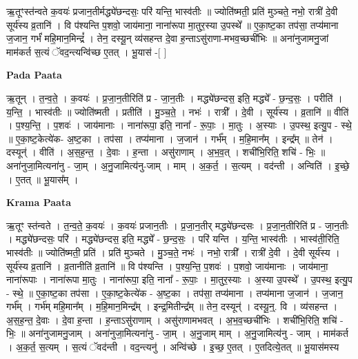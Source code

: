 \documentclass[17pt]{extarticle}
\begin{document}
ऋ॒तूꣳस्त॑न्वते क॒वयः॑ प्रजान॒तीर्मद्ध्ये॑छन्दसः॒ परि॑ यन्ति॒ भास्व॑तीः ॥ ज्योति॑ष्मती॒ प्रति॑ मुञ्चते॒ नभो॒ रात्री॑ दे॒वी सूर्य॑स्य व्र॒तानि॑ । वि प॑श्यन्ति प॒शवो॒ जाय॑माना॒ नाना॑रूपा मा॒तुर॒स्या उ॒पस्थे᳚ ॥ ए॒का॒ष्ट॒का तप॑सा॒ तप्य॑माना ज॒जान॒ गर्भं॑ महि॒मान॒मिन्द्रं᳚ । तेन॒ दस्यू॒न् व्य॑सहन्त दे॒वा ह॒न्ताऽसु॑राणा-मभव॒च्छची॑भिः ॥ अना॑नुजामनु॒जां माम॑कर्त स॒त्यं ॅवद॒न्त्यन्वि॑च्छ ए॒तत् । भू॒यास॑ -[  ] \newline

\textbf{Pada Paata} \newline

ऋ॒तून् । त॒न्व॒ते॒ । क॒वयः॑ । प्र॒जा॒न॒तीरिति॑ प्र - जा॒न॒तीः । मद्ध्ये॑छन्दस॒ इति॒ मद्ध्ये᳚ - छ॒न्द॒सः॒ । परीति॑ । य॒न्ति॒ । भास्व॑तीः ॥ ज्योति॑ष्मती । प्रतीति॑ । मु॒ञ्च॒ते॒ । नभः॑ । रात्री᳚ । दे॒वी । सूर्य॑स्य । व्र॒तानि॑ ॥ वीति॑ । प॒श्य॒न्ति॒ । प॒शवः॑ । जाय॑मानाः । नाना॑रूपा॒ इति॒ नाना᳚ - रू॒पाः॒ । मा॒तुः । अ॒स्याः । उ॒पस्थ॒ इत्यु॒प - स्थे॒ ॥ ए॒का॒ष्ट॒केत्ये॑क- अ॒ष्ट॒का । तप॑सा । तप्य॑माना । ज॒जान॑ । गर्भ᳚म् । म॒हि॒मान᳚म् । इन्द्र᳚म् ॥ तेन॑ । दस्यून्॑ । वीति॑ । अ॒स॒ह॒न्त॒ । दे॒वाः । ह॒न्ता । असु॑राणाम् । अ॒भ॒व॒त् । शची॑भि॒रिति॒ शचि॑ - भिः॒ ॥ अना॑नुजा॒मित्यना॑नु - जा॒म् । अ॒नु॒जामित्य॑नु-जाम् । माम् । अ॒क॒र्त॒ । स॒त्यम् । वद॑न्ती । अन्विति॑ । इ॒च्छे॒ । ए॒तत् ॥ भू॒यास᳚म् ।  \newline


\textbf{Krama Paata} \newline

ऋ॒तूꣳ स्त॑न्वते । त॒न्व॒ते॒ क॒वयः॑ । क॒वयः॑ प्रजान॒तीः । प्र॒जा॒न॒तीर् मद्ध्ये॑छन्दसः । प्र॒जा॒न॒तीरिति॑ प्र - जा॒न॒तीः । मद्ध्ये॑छन्दसः॒ परि॑ । मद्ध्ये॑छन्दस॒ इति॒ मद्ध्ये᳚ - छ॒न्द॒सः॒ । परि॑ यन्ति । य॒न्ति॒ भास्व॑तीः । भास्व॑ती॒रिति॒ भास्व॑तीः ॥ ज्योति॑ष्मती॒ प्रति॑ । प्रति॑ मुञ्चते । मु॒ञ्च॒ते॒ नभः॑ । नभो॒ रात्री᳚ । रात्री॑ दे॒वी । दे॒वी सूर्य॑स्य । सूर्य॑स्य व्र॒तानि॑ । व्र॒तानीति॑ व्र॒तानि॑ ॥ वि प॑श्यन्ति । प॒श्य॒न्ति॒ प॒शवः॑ । प॒शवो॒ जाय॑मानाः । जाय॑माना॒ नाना॑रूपाः । नाना॑रूपा मा॒तुः । नाना॑रूपा॒ इति॒ नाना᳚ - रू॒पाः॒ । मा॒तुर॒स्याः । अ॒स्या उ॒पस्थे᳚ । उ॒पस्थ॒ इत्यु॒प - स्थे॒ ॥ ए॒का॒ष्ट॒का तप॑सा । ए॒का॒ष्ट॒केत्ये॑क - अ॒ष्ट॒का । तप॑सा॒ तप्य॑माना । तप्य॑माना ज॒जान॑ । ज॒जान॒ गर्भ᳚म् । गर्भ॑म् महि॒मान᳚म् । म॒हि॒मान॒मिन्द्र᳚म् । इन्द्र॒मितीन्द्र᳚म् ॥ तेन॒ दस्यून्॑ । दस्यू॒न्॒. वि । व्य॑सहन्त । अ॒स॒ह॒न्त॒ दे॒वाः । दे॒वा ह॒न्ता । ह॒न्ताऽसु॑राणाम् । असु॑राणामभवत् । अ॒भ॒व॒च्छची॑भिः । शची॑भि॒रिति॒ शचि॑ - भिः॒ ॥ अना॑नुजामनु॒जाम् । अना॑नुजा॒मित्यना॑नु - जा॒म् । अ॒नु॒जाम् माम् । अ॒नु॒जामित्य॑नु - जाम् । माम॑कर्त । अ॒क॒र्त॒ स॒त्यम् । स॒त्यं ॅवद॑न्ती । वद॒न्त्यनु॑ । अन्वि॑च्छे । इ॒च्छ॒ ए॒तत् । ए॒तदित्ये॒तत् ॥ भू॒यास॑मस्य \newline
\end{document}
